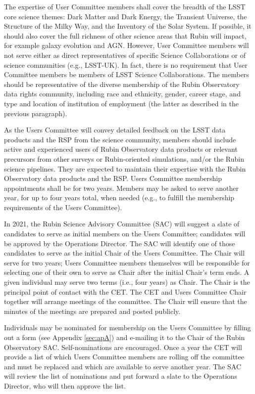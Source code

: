 \documentclass[OPS,toc]{lsstdoc}
\begin{document}
The expertise of User Committee members shall cover the breadth of the LSST core science themes: Dark Matter and Dark Energy, the Transient Universe, the Structure of the Milky Way, and the Inventory of the Solar System.
If possible, it should also cover the full richness of other science areas that Rubin will impact, for example galaxy evolution and AGN.
However, User Committee members will not serve either as direct representatives of specific Science Collaborations or of science communities (e.g., LSST-UK).
In fact, there is no requirement that User Committee members be members of LSST Science Collaborations.
The members should be representative of the diverse membership of the Rubin Observatory data rights community, including race and ethnicity, gender, career stage, and type and location of institution of employment (the latter as described in the previous paragraph).

As the Users Committee will convey detailed feedback on the LSST data products and the RSP from the science community, members should include active and experienced users of Rubin Observatory data products or relevant precursors from other surveys or Rubin-oriented simulations, and/or the Rubin science pipelines.
They are expected to maintain their expertise with the Rubin Observatory data products and the RSP.
Users Committee membership appointments shall be for two years. 
Members may be asked to serve another year, for up to four years total, when needed (e.g., to fulfill the membership requirements of the Users Committee).

In 2021, the Rubin Science Advisory Committee (SAC) will suggest a slate of candidates to serve as initial members on the Users Committee; candidates will be approved by the Operations Director.
The SAC will identify one of those candidates to serve as the initial Chair of the Users Committee.
The Chair will serve for two years; Users Committee members themselves will be responsible for selecting one of their own to serve as Chair after the initial Chair’s term ends.
A given individual may serve two terms (i.e., four years) as Chair.
The Chair is the principal point of contact with the CET.
The CET and Users Committee Chair together will arrange meetings of the committee.
The Chair will ensure that the minutes of the meetings are prepared and posted publicly. 

Individuals may be nominated for membership on the Users Committee by filling out a form (see Appendix \ref{sec:apA}) and e-mailing it to the Chair of the Rubin Observatory SAC.
Self-nominations are  encouraged.
Once a year the CET will provide a list of which Users Committee members are rolling off the committee and must be replaced and which are available to serve another year.
The SAC will review the list of nominations and put forward a slate to the Operations Director, who will then approve the list.
\end{document}
